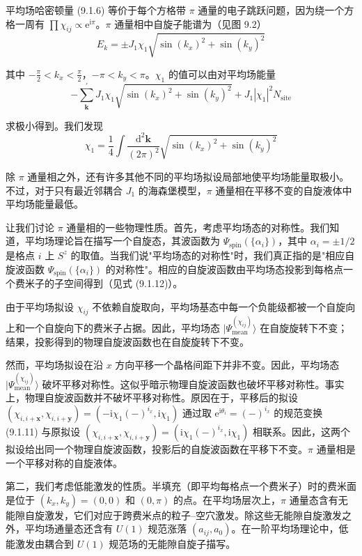 平均场哈密顿量 (9.1.6) 等价于每个方格带 $\pi$ 通量的电子跳跃问题，因为绕一个方格一周有 $\prod\chi_{ij}\propto\mathrm{e}^{\mathrm{i}\pi}$。$\pi$ 通量相中自旋子能谱为（见图 9.2）
\begin{equation*}
E_k=\pm J_1\chi_1\sqrt{\sin(k_x)^{2}+\sin(k_y)^{2}}
\tag{9.1.19}
\end{equation*}

其中 $-\frac{\pi}{2}<k_x<\frac{\pi}{2}$，$-\pi<k_y<\pi$。$\chi_1$ 的值可以由对平均场能量
\begin{equation*}
-\sum_{\pmb{k}}^{\prime}J_1\chi_1\sqrt{\sin(k_x)^{2}+\sin(k_y)^{2}}+J_1|\chi_1|^{2}N_{\text{site}}
\end{equation*}

求极小得到。我们发现
\begin{equation*}
\chi_1=\frac{1}{4}\int\frac{\mathrm{d}^{2}\pmb{k}}{(2\pi)^{2}}\sqrt{\sin(k_x)^{2}+\sin(k_y)^{2}}
\end{equation*}

除 $\pi$ 通量相之外，还有许多其他不同的平均场拟设局部地使平均场能量取极小。不过，对于只有最近邻耦合 $J_1$ 的海森堡模型，$\pi$ 通量相在平移不变的自旋液体中平均场能量最低。

让我们讨论 $\pi$ 通量相的一些物理性质。首先，考虑平均场态的对称性。我们知道，平均场理论旨在描写一个自旋态，其波函数为 $\Psi_{\text{spin}}(\{\alpha_i\})$，其中 $\alpha_i=\pm 1/2$ 是格点 $i$ 上 $S^{z}$ 的取值。当我们说"平均场态的对称性"时，我们真正指的是"相应自旋波函数 $\Psi_{\text{spin}}(\{\alpha_i\})$ 的对称性"。相应的自旋波函数由平均场态投影到每格点一个费米子的子空间得到（见式 (9.1.12)）。

由于平均场拟设 $\chi_{ij}$ 不依赖自旋取向，平均场基态中每一个负能级都被一个自旋向上和一个自旋向下的费米子占据。因此，平均场态 $|\Psi^{(\chi_{ij})}_{\text{mean}}\rangle$ 在自旋旋转下不变；结果，投影得到的物理自旋波函数也在自旋旋转下不变。

然而，平均场拟设在沿 $x$ 方向平移一个晶格间距下并非不变。因此，平均场态 $|\Psi^{(\chi_{ij})}_{\text{mean}}\rangle$ 破坏平移对称性。这似乎暗示物理自旋波函数也破坏平移对称性。事实上，物理自旋波函数并不破坏平移对称性。原因在于，平移后的拟设 $(\chi_{i,i+\pmb{x}},\chi_{i,i+\pmb{y}})=(-\mathrm{i}\chi_1(-)^{i_x},\mathrm{i}\chi_1)$ 通过取 $\mathrm{e}^{\mathrm{i}\theta_i}=(-)^{i_x}$ 的规范变换 (9.1.11) 与原拟设 $(\chi_{i,i+\pmb{x}},\chi_{i,i+\pmb{y}})=(\mathrm{i}\chi_1(-)^{i_x},\mathrm{i}\chi_1)$ 相联系。因此，这两个拟设给出同一个物理自旋波函数，投影后的自旋波函数在平移下不变。$\pi$ 通量相是一个平移对称的自旋液体。

第二，我们考虑低能激发的性质。半填充（即平均每格点一个费米子）时的费米面是位于 $(k_x,k_y)=(0,0)$ 和 $(0,\pi)$ 的点。在平均场层次上，$\pi$ 通量态含有无能隙自旋激发，它们对应于跨费米点的粒子–空穴激发。除这些无能隙自旋激发之外，平均场通量态还含有 $U(1)$ 规范涨落 $(a_{ij},a_0)$。在一阶平均场理论中，低能激发由耦合到 $U(1)$ 规范场的无能隙自旋子描写。

